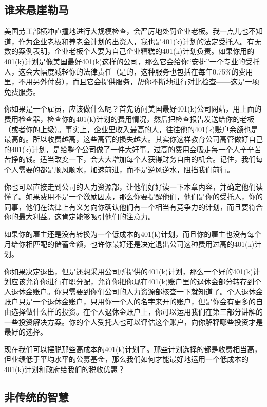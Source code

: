 \subsection{谁来悬崖勒马}

美国劳工部横冲直撞地进行大规模检查，会严厉地处罚企业老板。我一点儿也不知道，作为企业老板和养老金计划的出资人，我也是401(k)计划的法定受托人。有无数的案例表明，企业老板个人要为自己企业糟糕的401(k)计划负责。如果你用的401(k)计划是像美国最好401(k)这样的公司，那么它会给你“安排”一个专业的受托人，这会大幅度减轻你的法律责任（是的，这种服务也包括在每年0.75\%的费用里，不用另外付费），而且它会提供服务，帮你不断地进行对比检查——这是一项免费服务。

你如果是一个雇员，应该做什么呢？首先访问美国最好401(k)公司网站，用上面的费用检查器，检查你的401(k)计划的费用情况，然后把检查报告发送给你的老板（或者你的上级）。事实上，企业里收入最高的人，往往他的401(k)账户余额也是最高的。所以收费越高，这些高管的损失越大。其实你这样教育公司高管做好自己的401(k)计划，是给整个公司做了一件大好事。过高的费用会吸走每一个人辛辛苦苦挣的钱。适当改变一下，会大大增加每个人获得财务自由的机会。记住，我们每个人需要的都是顺风顺水，加速前进，而不是逆风逆水，阻挡我们前行。

你也可以直接走到公司的人力资源部，让他们好好读一下本章内容，并确定他们读懂了。如果费用不是一个激励因素，那么你要提醒他们，他们是你的受托人，你的同事，他们在法律上有义务向你确认他们有一个相当有竞争力的计划，而且要符合你的最大利益。这肯定能够吸引他们的注意力。

如果你的雇主还是没有转换为一个低成本的401(k)计划，而且你的雇主也没有每个月给你相匹配的储蓄金额，也许你最好还是决定退出公司这种费用过高的401(k)计划。

你如果决定退出，但是还想采用公司所提供的401(k)计划，那么一个好的401(k)计划应该允许你进行在职分配，允许你把你现在401(k)账户里的退休金部分转存到个人退休金账户。你只需要到你们公司的人力资源部核查一下就知道了。个人退休金账户只是一个退休金账户，只用你一个人的名字来开的账户，但是你会有更多的自由选择做什么样的投资。在个人退休金账户上，你可以运用我们在第三部分讲解的一些投资解决方案。你的个人受托人也可以评估这个账户，向你解释哪些投资才是最好的选择。

现在我们可以摆脱那些高成本的401(k)计划了。那些计划选择的都是收费相当高，但业绩低于平均水平的公募基金，那么我们如何才能最好地运用一个低成本的401(k)计划和政府给我们的税收优惠？

\subsection{非传统的智慧}

